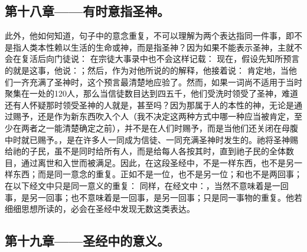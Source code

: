 
\subsection{第十八章——有时意指圣神。}

此外，他如何知道，句子中的意念重复，不可以理解为两个表达指同一件事，即不是指人类本性赖以生活的生命或神，而是指圣神？因为如果不能表示圣神，主就不会在复活后向门徒说：  在宗徒大事录中也不会这样记载：  现在，假设先知所预言的就是这事，他说：；然后，作为对他所说的的解释，他接着说： 肯定地，当他们一齐充满了圣神时，这个预言最清楚地应验了。然而，如果一词尚不适用于当时聚集在一处的120人，那么当信徒数目达到四五千，他们受洗时领受了圣神，难道还有人怀疑那时领受圣神的人就是，甚至吗？因为那属于人的本性的神，无论是通过赐予，还是作为新东西吹入个人（我不决定这两种方式中哪一种应当被肯定，至少在两者之一能清楚确定之前），并不是在人们时赐予，而是当他们还关闭在母腹中时就已赐予。，是在许多人一同成为信徒、一同充满圣神时发生的。祂将圣神赐给祂的子民，虽不是同时给所有人，而是给每人各按其时，直到祂子民的全体数目，通过离世和入世而被满足。因此，在这段圣经中，不是一样东西，也不是另一样东西；而是同一意念的重复。正如不是一位，也不是另一位；和也不是两回事；在以下经文中只是同一意义的重复： 同样，在经文中：，当然不意味着是一回事，是另一回事；也不意味着是一回事，是另一回事；只是同一事物的重复。他若细细思想所读的，必会在圣经中发现无数这类表达。\par


\subsection{第十九章——圣经中的意义。}

